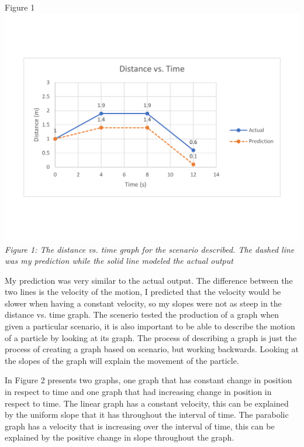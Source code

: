 \documentclass[aps,letterpaper,11pt]{revtex4}
\begin{document}
\begin{center}
Figure 1\\
\vspace{-20mm}
\includegraphics[width=6in]{Graph1.pdf}\\
\vspace{-20mm}
\textit{Figure 1: The distance vs. time graph for the scenario described. The dashed line was my prediction while the solid line modeled the actual output}
\end{center}

My prediction was very similar to the actual output. The difference between the two lines is the velocity of the motion, I predicted that the velocity would be slower when having a constant velocity, so my slopes were not as steep in the distance vs. time graph. The scenerio tested the production of a graph when given a particular scenario, it is also important to be able to describe the motion of a particle by looking at its graph. The process of describing a graph is just the process of creating a graph based on scenario, but working backwards. Looking at the slopes of the graph will explain the movement of the particle.

In Figure 2 presents two graphs, one graph that has constant change in position in respect to time and one graph that had increasing change in position in respect to time. The linear graph has a constant velocity, this can be explained by the uniform slope that it has throughout the interval of time. The parabolic graph has a velocity that is increasing over the interval of time, this can be explained by the  positive change in slope throughout the graph. 
\end{document}

